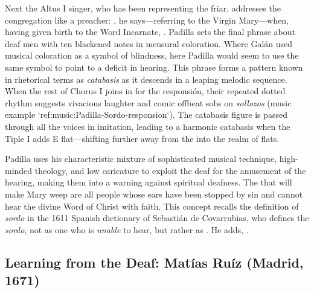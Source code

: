 Next the Altus I singer, who has been representing the friar, addresses the congregation like a preacher: , he says---referring to the Virgin Mary---when, having given birth to the Word Incarnate, .
Padilla sets the final phrase about deaf men with ten blackened notes in mensural coloration.
Where Galán used musical coloration as a symbol of blindness, here Padilla would seem to use the same symbol to point to a deficit in hearing.
This phrase forms a pattern known in rhetorical terms as \emph{catabasis} as it descends in a leaping melodic sequence.
When the rest of Chorus I joins in for the responsión, their repeated dotted rhythm suggests vivacious laughter and comic offbeat sobs on \emph{sollozos} (music example `ref:music:Padilla-Sordo-responsion`).
The catabasis figure is passed through all the voices in imitation, leading to a harmonic catabasis when the Tiple I adds E flat---shifting further away from the  into the  realm of flats.


\label{music:Padilla-Sordo-responsion}

Padilla uses his characteristic mixture of sophisticated musical technique, high-minded theology, and low caricature to exploit the deaf for the amusement of the hearing, making them into a warning against spiritual deafness.
The  that will make Mary weep are all people whose ears have been stopped by sin and cannot hear the divine Word of Christ with faith.
This concept recalls the definition of \emph{sordo} in the 1611 Spanish dictionary of Sebastián de Covarrubias, who defines the \emph{sordo}, not as one who is \emph{unable} to hear, but rather as .
He adds, .
\Autocite[: .]{Covarrubias:Tesoro}


\subsection{Learning from the Deaf: Matías Ruíz (Madrid, 1671)}

